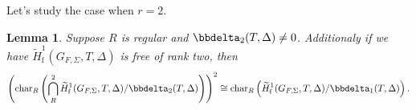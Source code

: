 \documentclass[10pt]{amsart}
\numberwithin{equation}{section}
\newtheorem{lemma}[thm]{Lemma}
\theoremstyle{definition}
\theoremstyle{remark} %
\begin{document}
		\subsubsection{}
		Let's study the case when $r=2$. 
		\begin{lemma}
			Suppose $R$ is regular and $\bbdelta_2(T,\Delta) \ne 0 $. Additionaly if we have $ \widetilde{H}^1_{\mathrm{f}}(G_{F,\Sigma},T,\Delta) $ is free of rank two, then 
			$$ \left(\mathrm{char}_R\left(\bigcap^2_R\widetilde{H}^1_{\mathrm{f}}(G_{F,\Sigma},T,\Delta)/\bbdelta_2(T,\Delta)\right) \right)^2 \cong \mathrm{char}_R\left(\widetilde{H}^1_{\mathrm{f}}(G_{F,\Sigma},T,\Delta)/\bbdelta_1(T,\Delta)\right).$$
		\end{lemma}
\end{document}
